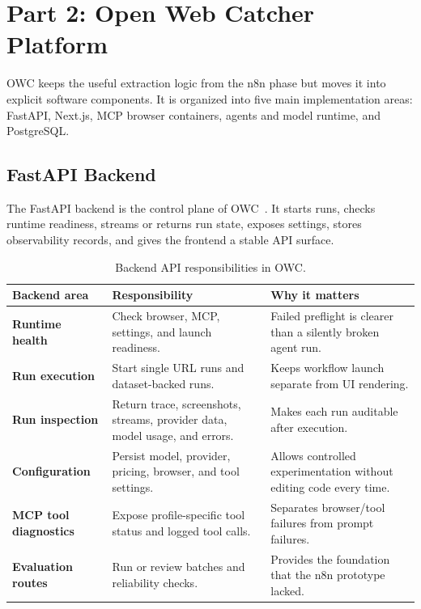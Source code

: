 

\section{Part 2: Open Web Catcher Platform}

OWC keeps the useful extraction logic from the n8n phase but
moves it into explicit software components. It is organized into five main
implementation areas: FastAPI, Next.js, MCP browser containers, agents and model
runtime, and PostgreSQL\@.



\subsection{FastAPI Backend}

The FastAPI backend is the control plane of OWC~\cite{fastapi}. It starts
runs, checks runtime readiness, streams or returns run state, exposes settings,
stores observability records, and gives the frontend a stable API surface.

\begin{table}[!htbp]
\centering
\begin{tabularx}{\textwidth}{>{\raggedright\arraybackslash\bfseries}p{3.4cm}
                              >{\raggedright\arraybackslash}X
                              >{\raggedright\arraybackslash}X}
\toprule
\rowcolor{accent!8}
Backend area & Responsibility & Why it matters \\
\midrule
Runtime health & Check browser, MCP, settings, and launch readiness. & Failed
preflight is clearer than a silently broken agent run. \\
Run execution & Start single URL runs and dataset-backed runs. & Keeps workflow
launch separate from UI rendering. \\
Run inspection & Return trace, screenshots, streams, provider data, model usage,
and errors. & Makes each run auditable after execution. \\
Configuration & Persist model, provider, pricing, browser, and tool settings. &
Allows controlled experimentation without editing code every time. \\
MCP tool diagnostics & Expose profile-specific tool status and logged tool calls.
& Separates browser/tool failures from prompt failures. \\
Evaluation routes & Run or review batches and reliability checks. & Provides the
foundation that the n8n prototype lacked. \\
\bottomrule
\end{tabularx}
\caption{Backend API responsibilities in OWC.}\label{tab:fastapi-responsibilities}
\end{table}


